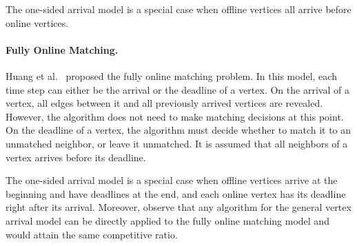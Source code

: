 The one-sided arrival model is a special case when offline vertices all arrive before online vertices.

\paragraph{Fully Online Matching.}
Huang et al.~\cite{jacm/HuangKTWZZ20} proposed the fully online matching problem. In this model, each time step can either be the arrival or the deadline of a vertex. On the arrival of a vertex, all edges between it and all previously arrived vertices are revealed. However, the algorithm does not need to make matching decisions at this point. On the deadline of a vertex, the algorithm must decide whether to match it to an unmatched neighbor, or leave it unmatched. It is assumed that all neighbors of a vertex arrives before its deadline.  

The one-sided arrival model is a special case when offline vertices arrive at the beginning and have deadlines at the end, and each online vertex has its deadline right after its arrival. Moreover, observe that any algorithm for the general vertex arrival model can be directly applied to the fully online matching model and would attain the same competitive ratio. 


